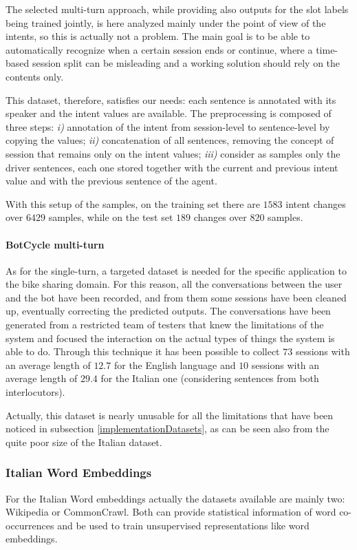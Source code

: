 The selected multi-turn approach, while providing also outputs for the slot labels being trained jointly, is here analyzed mainly under the point of view of the intents, so this is actually not a problem. The main goal is to be able to automatically recognize when a certain session ends or continue, where a time-based session split can be misleading and a working solution should rely on the contents only.

This dataset, therefore, satisfies our needs: each sentence is annotated with its speaker and the intent values are available. The preprocessing is composed of three steps: \textit{i)} annotation of the intent from session-level to sentence-level by copying the values; \textit{ii)} concatenation of all sentences, removing the concept of session that remains only on the intent values; \textit{iii)} consider as samples only the driver sentences, each one stored together with the current and previous intent value and with the previous sentence of the agent.

With this setup of the samples, on the training set there are  \( 1583 \)  intent changes over  \( 6429 \)  samples, while on the test set  \( 189 \)  changes over  \( 820 \)  samples.

\paragraph{BotCycle multi-turn}
As for the single-turn, a targeted dataset is needed for the specific application to the bike sharing domain. For this reason, all the conversations between the user and the bot have been recorded, and from them some sessions have been cleaned up, eventually correcting the predicted outputs. The conversations have been generated from a restricted team of testers that knew the limitations of the system and focused the interaction on the actual types of things the system is able to do. Through this technique it has been possible to collect  \( 73 \)  sessions with an average length of  \( 12.7 \)  for the English language and  \( 10 \)  sessions with an average length of  \( 29.4 \)  for the Italian one (considering sentences from both interlocutors).

Actually, this dataset is nearly unusable for all the limitations that have been noticed in subsection \ref{implementationDatasets}, as can be seen also from the quite poor size of the Italian dataset.

\subsubsection{Italian Word Embeddings}
For the Italian Word embeddings actually the datasets available are mainly two: Wikipedia or CommonCrawl. Both can provide statistical information of word co-occurrences and be used to train unsupervised representations like word embeddings.

